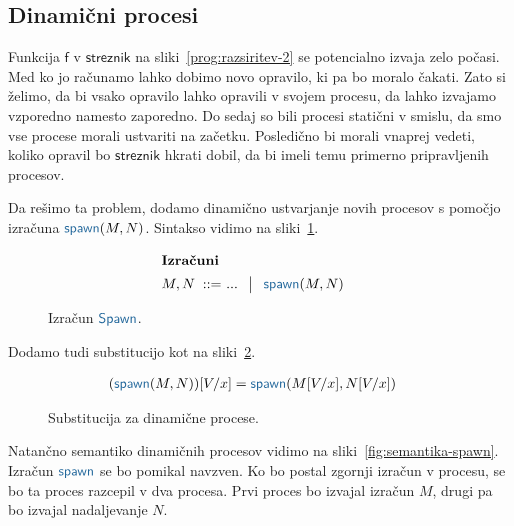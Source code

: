 \subsection{Dinamični procesi}

Funkcija $\mathsf{f}$ v $\mathsf{streznik}$ na sliki~\ref{prog:razsiritev-2} se potencialno izvaja zelo počasi. Med ko jo računamo lahko dobimo novo opravilo, ki pa bo moralo čakati. Zato si želimo, da bi vsako opravilo lahko opravili v svojem procesu, da lahko izvajamo vzporedno namesto zaporedno. 
Do sedaj so bili procesi statični v smislu, da smo vse procese morali ustvariti na začetku.
Posledično bi morali vnaprej vedeti, koliko opravil bo $\mathsf{streznik}$ hkrati dobil, da bi imeli temu primerno pripravljenih procesov.

Da rešimo ta problem, dodamo dinamično ustvarjanje novih procesov s pomočjo izračuna $\tmspawn{M}{N}$. Sintakso vidimo na sliki~\ref{fig:izračun-spawn}. 

\begin{figure}[H]	
	\centering
	\small
	\begin{align*}
	\shortintertext{\textbf{Izračuni}}
	M, N
	\bnfis & ... \,\bnfor\! \tmspawn{M}{N}
	\end{align*}
	
	\caption{Izračun $\tmkw{Spawn}$.}
	\label{fig:izračun-spawn}
\end{figure}

Dodamo tudi substitucijo kot na sliki~\ref{fig:substitucija-spawn}.

\begin{figure}[H]
	\centering
	\small
	\begin{align*}
		(\tmspawn{M}{N})[V/x] &= \tmspawn{M[V/x]}{N[V/x]}
	\end{align*}
	\caption{Substitucija za dinamične procese.}
	\label{fig:substitucija-spawn}
\end{figure}

Natančno semantiko dinamičnih procesov vidimo na sliki~\ref{fig:semantika-spawn}. Izračun $\tmkw{spawn}$ se bo pomikal navzven. Ko bo postal zgornji izračun v procesu, se bo ta proces razcepil v dva procesa. 
Prvi proces bo izvajal izračun $M$, drugi pa bo izvajal nadaljevanje $N$.

